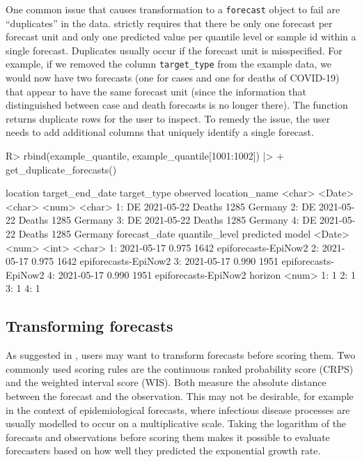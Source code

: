 \documentclass[
]{jss}
\begin{document}
One common issue that causes transformation to a \texttt{forecast}
object to fail are ``duplicates'' in the data. 
strictly requires that there be only one forecast per forecast unit and
only one predicted value per quantile level or sample id within a single
forecast. Duplicates usually occur if the forecast unit is misspecified.
For example, if we removed the column \texttt{target\_type} from the
example data, we would now have two forecasts (one for cases and one for
deaths of COVID-19) that appear to have the same forecast unit (since
the information that distinguished between case and death forecasts is
no longer there). The function 
returns duplicate rows for the user to inspect. To remedy the issue, the
user needs to add additional columns that uniquely identify a single
forecast.

\begin{CodeChunk}
\begin{CodeInput}
R> rbind(example_quantile, example_quantile[1001:1002]) |>
+   get_duplicate_forecasts() 
\end{CodeInput}
\begin{CodeOutput}
   location target_end_date target_type observed location_name
     <char>          <Date>      <char>    <num>        <char>
1:       DE      2021-05-22      Deaths     1285       Germany
2:       DE      2021-05-22      Deaths     1285       Germany
3:       DE      2021-05-22      Deaths     1285       Germany
4:       DE      2021-05-22      Deaths     1285       Germany
   forecast_date quantile_level predicted                model
          <Date>          <num>     <int>               <char>
1:    2021-05-17          0.975      1642 epiforecasts-EpiNow2
2:    2021-05-17          0.975      1642 epiforecasts-EpiNow2
3:    2021-05-17          0.990      1951 epiforecasts-EpiNow2
4:    2021-05-17          0.990      1951 epiforecasts-EpiNow2
   horizon
     <num>
1:       1
2:       1
3:       1
4:       1
\end{CodeOutput}
\end{CodeChunk}

\subsection{Transforming forecasts}\label{transforming-forecasts}

As suggested in \cite{bosseScoringEpidemiologicalForecasts2023}, users
may want to transform forecasts before scoring them. Two commonly used
scoring rules are the continuous ranked probability score (CRPS) and the
weighted interval score (WIS). Both measure the absolute distance
between the forecast and the observation. This may not be desirable, for
example in the context of epidemiological forecasts, where infectious
disease processes are usually modelled to occur on a multiplicative
scale. Taking the logarithm of the forecasts and observations before
scoring them makes it possible to evaluate forecasters based on how well
they predicted the exponential growth rate.
\end{document}
